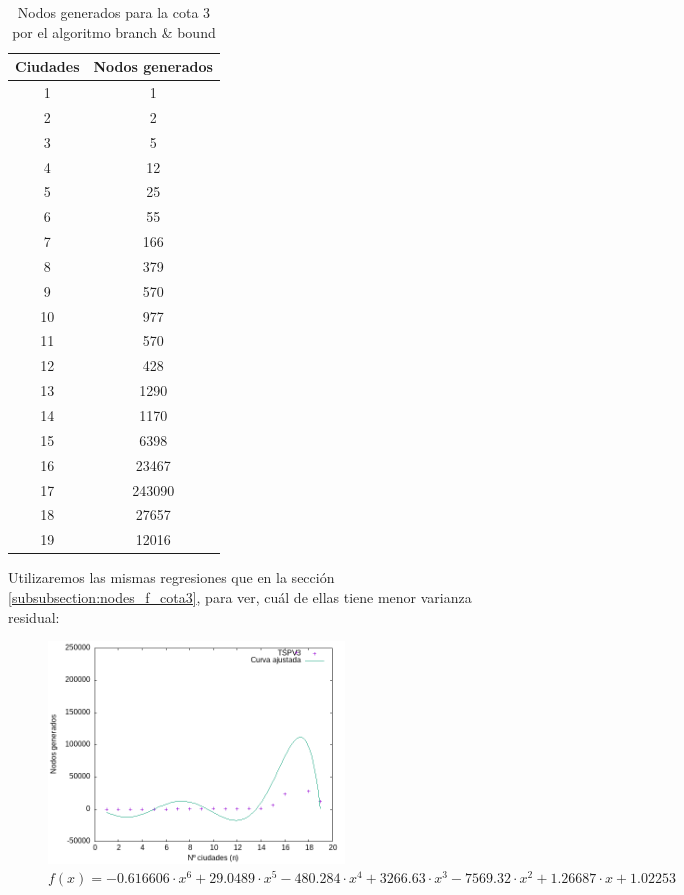 \documentclass{article}
\begin{document}
\begin{table}[h!]
\centering
\begin{tabular}{|c|c|}
\hline
\textbf{Ciudades} & \textbf{Nodos generados} \\
\hline
1 & 1 \\
\hline
2 & 2 \\
\hline
3 & 5 \\
\hline
4 & 12 \\
\hline
5 & 25 \\
\hline
6 & 55 \\
\hline
7 & 166 \\
\hline
8 & 379 \\
\hline
9 & 570 \\
\hline
10 & 977 \\
\hline
11 & 570 \\
\hline
12 & 428 \\
\hline
13 & 1290 \\
\hline
14 & 1170 \\
\hline
15 & 6398 \\
\hline
16 & 23467 \\
\hline
17 & 243090 \\
\hline
18 & 27657 \\
\hline
19 & 12016 \\
\hline
\end{tabular}
\caption{Nodos generados para la cota 3 por el algoritmo branch \& bound}
\label{tab:datos}
\end{table}

Utilizaremos las mismas regresiones que en la sección \ref{subsubsection:nodes_f_cota3}, para ver, cuál de ellas tiene menor varianza residual:

\begin{figure}[H]
    \centering
    \includegraphics[width=0.7\textwidth]{imagenes/cota3/CurvaAjustada_n6_bb.png}
    \caption*{$f(x)=-0.616606 \cdot x^6 + 29.0489\cdot x^5 -480.284 \cdot x^4 + 3266.63 \cdot x^3 -7569.32 \cdot x^2 + 1.26687 \cdot x + 1.02253$}
\end{figure}
\end{document}
